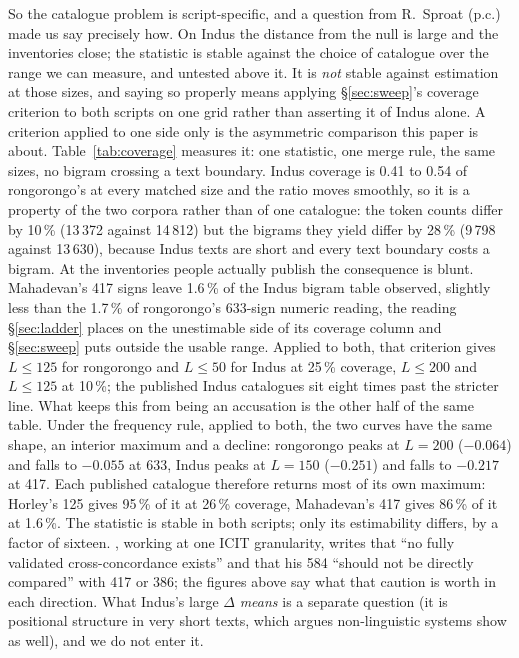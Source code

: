 \documentclass[11pt,a4paper]{article}
\begin{document}
\begin{enumerate}
So the catalogue problem is script-specific, and a question from R.~Sproat (p.c.) made us say precisely how. On Indus the distance from the null is large and the inventories close; the statistic is stable against the choice of catalogue over the range we can measure, and untested above it. It is \emph{not} stable against estimation at those sizes, and saying so properly means applying \S\ref{sec:sweep}'s coverage criterion to both scripts on one grid rather than asserting it of Indus alone. A criterion applied to one side only is the asymmetric comparison this paper is about. Table~\ref{tab:coverage} measures it: one statistic, one merge rule, the same sizes, no bigram crossing a text boundary. Indus coverage is 0.41 to 0.54 of rongorongo's at every matched size and the ratio moves smoothly, so it is a property of the two corpora rather than of one catalogue: the token counts differ by 10\,\% (13\,372 against 14\,812) but the bigrams they yield differ by 28\,\% (9\,798 against 13\,630), because Indus texts are short and every text boundary costs a bigram. At the inventories people actually publish the consequence is blunt. Mahadevan's 417 signs leave 1.6\,\% of the Indus bigram table observed, slightly less than the 1.7\,\% of rongorongo's 633-sign numeric reading, the reading \S\ref{sec:ladder} places on the unestimable side of its coverage column and \S\ref{sec:sweep} puts outside the usable range. Applied to both, that criterion gives $L\le125$ for rongorongo and $L\le50$ for Indus at 25\,\% coverage, $L\le200$ and $L\le125$ at 10\,\%; the published Indus catalogues sit eight times past the stricter line. What keeps this from being an accusation is the other half of the same table. Under the frequency rule, applied to both, the two curves have the same shape, an interior maximum and a decline: rongorongo peaks at $L=200$ ($-0.064$) and falls to $-0.055$ at 633, Indus peaks at $L=150$ ($-0.251$) and falls to $-0.217$ at 417. Each published catalogue therefore returns most of its own maximum: Horley's 125 gives 95\,\% of it at 26\,\% coverage, Mahadevan's 417 gives 86\,\% of it at 1.6\,\%. The statistic is stable in both scripts; only its estimability differs, by a factor of sixteen. \citet{nair2026}, working at one ICIT granularity, writes that ``no fully validated cross-concordance exists'' and that his 584 ``should not be directly compared'' with 417 or 386; the figures above say what that caution is worth in each direction. What Indus's large $\Delta$ \emph{means} is a separate question (it is positional structure in very short texts, which \citet{sproat2014} argues non-linguistic systems show as well), and we do not enter it.

\end{enumerate}
\end{document}
